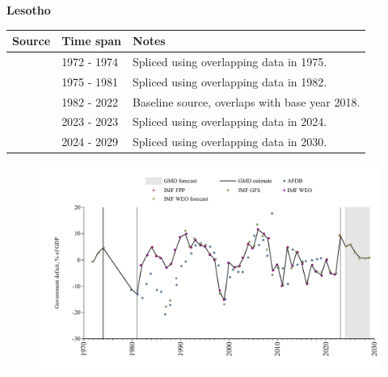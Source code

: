 \documentclass[12pt,a4paper,landscape]{article}
\begin{document}
\begin{adjustbox}{max totalsize={\paperwidth}{\paperheight},center}
\begin{minipage}[t][\textheight][t]{\textwidth}
\vspace*{0.5cm}
{}
\begin{center}
{\Large\bfseries Lesotho}
\end{center}
\vspace{0.5cm}
\begin{table}[H]
\centering
\small
\begin{tabular}{|l|l|l|}
\hline
\textbf{Source} & \textbf{Time span} & \textbf{Notes} \\
\hline
\rowcolor{white}\cite{IMF_GFS}& 1972 - 1974 &Spliced using overlapping data in 1975.\\
\rowcolor{lightgray}\cite{AFDB}& 1975 - 1981 &Spliced using overlapping data in 1982.\\
\rowcolor{white}\cite{IMF_WEO}& 1982 - 2022 &Baseline source, overlaps with base year 2018.\\
\rowcolor{lightgray}\cite{IMF_FPP}& 2023 - 2023 &Spliced using overlapping data in 2024.\\
\rowcolor{white}\cite{IMF_WEO_forecast}& 2024 - 2029 &Spliced using overlapping data in 2030.\\
\hline
\end{tabular}
\end{table}
\begin{figure}[H]
\centering
\includegraphics[width=\textwidth,height=0.6\textheight,keepaspectratio]{graphs/LSO_govdef_GDP.pdf}
\end{figure}
\end{minipage}
\end{adjustbox}
\end{document}
